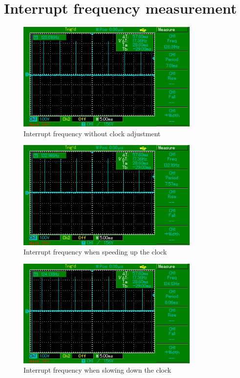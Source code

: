 \chapter{Interrupt frequency measurement}\label{app:interrupt-frequency}
\begin{figure}[H]
  \centering
  \includegraphics[width=9cm,keepaspectratio]{fig/osc-no-adjust.png}
  \caption{Interrupt frequency without clock adjustment}
\end{figure}

\begin{figure}[H]
  \centering
  \includegraphics[width=9cm,keepaspectratio]{fig/osc-speed-up.png}
  \caption{Interrupt frequency when speeding up the clock}
\end{figure}

\begin{figure}[H]
  \centering
  \includegraphics[width=9cm,keepaspectratio]{fig/osc-slow-down.png}
  \caption{Interrupt frequency when slowing down the clock}
\end{figure}

